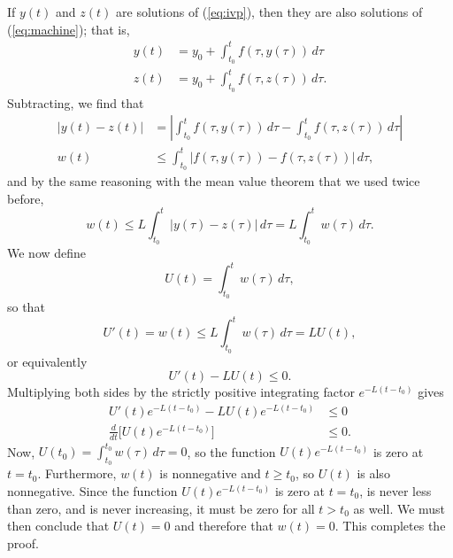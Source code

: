 \documentclass{myart}
\newcommand{\eq}[1]{(\ref{eq:#1})}
\begin{document}
If $y(t)$ and $z(t)$ are solutions of \eq{ivp}, then they are also
solutions of \eq{machine}; that is,
\begin{align*}
y(t) &= y_0 + \int_{t_0}^t f(\tau, y(\tau)) \,d\tau \\
z(t) &= y_0 + \int_{t_0}^t f(\tau, z(\tau)) \,d\tau.
\end{align*}
Subtracting, we find that
\begin{align*}
      \big|y(t) - z(t)\big|
&   = \left|  \int_{t_0}^t f(\tau, y(\tau)) \,d\tau
            - \int_{t_0}^t f(\tau, z(\tau)) \,d\tau\right| \\
w(t)
&\leq \int_{t_0}^t \Big|  f(\tau, y(\tau))
                        - f(\tau, z(\tau))
                   \Big| \,d\tau,
\end{align*}
and by the same reasoning with the mean value theorem that we used
twice before,
\begin{equation*}
     w(t)
\leq L \int_{t_0}^t \big|y(\tau) - z(\tau)\big| \,d\tau
   = L \int_{t_0}^t w(\tau) \,d\tau.
\end{equation*}
We now define
\begin{equation*}
U(t) = \int_{t_0}^t w(\tau) \,d\tau,
\end{equation*}
so that
\begin{equation*}
U'(t) = w(t) \leq L \int_{t_0}^t w(\tau) \,d\tau = LU(t),
\end{equation*}
or equivalently
\begin{equation*}
U'(t) - LU(t) \leq 0.
\end{equation*}
Multiplying both sides by the strictly positive integrating factor
$e^{-L(t - t_0)}$ gives
\begin{align*}
U'(t) e^{-L(t - t_0)} - LU(t) e^{-L(t - t_0)} &\leq 0 \\
\frac{d}{dt} \Big[U(t) e^{-L(t - t_0)}\Big] &\leq 0.
\end{align*}
Now, $U(t_0) = \int_{t_0}^{t_0} w(\tau) \,d\tau = 0$, so the function
$U(t) e^{-L(t - t_0)}$ is zero at $t = t_0$. Furthermore, $w(t)$ is
nonnegative and $t \geq t_0$, so $U(t)$ is also nonnegative. Since the
function $U(t) e^{-L(t - t_0)}$ is zero at $t = t_0$, is never less
than zero, and is never increasing, it must be zero for all $t > t_0$
as well. We must then conclude that $U(t) = 0$ and therefore that
$w(t) = 0$. This completes the proof.
\end{document}
